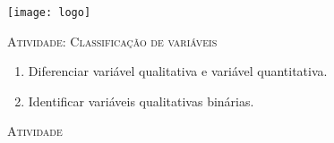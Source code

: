 \documentclass[10 pt,usenames,dvipsnames, oneside]{article}
\begin{document}
\begin{center}
  \begin{minipage}[l]{3cm}
\texttt{[image: logo]}    
\end{minipage}\hfill
\begin{minipage}[r]{.8\textwidth}
 {\Large \scshape Atividade: Classificação de variáveis}  
\end{minipage}
\end{center}
\vspace{.2cm}

\ifdefined\prof
\begin{objetivos}
\item 
\end{objetivos}

\begin{goals}
\begin{enumerate}
\item Diferenciar variável qualitativa e variável quantitativa.
\item Identificar variáveis qualitativas binárias.
\end{enumerate}

\end{goals}

\bigskip
\begin{center}
{\large \scshape Atividade}
\end{center}
\fi
\end{document}
